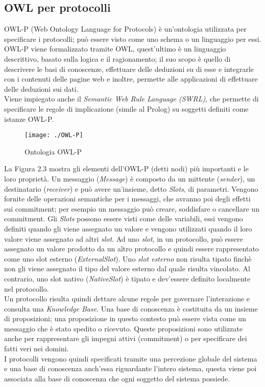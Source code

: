\documentclass[a4paper,12pt]{report}
\begin{document}
\subsection{OWL per protocolli}
OWL-P (Web Ontology Language for Protocols) è un'ontologia utilizzata per specificare i protocolli; può essere visto come uno schema o un linguaggio per essi.\\
OWL-P viene formalizzato tramite OWL, quest'ultimo è un linguaggio descrittivo, basato sulla logica e il ragionamento; il suo scopo è quello di descrivere le basi di conoscenze, effettuare delle deduzioni su di esse e integrarle con i contenuti delle pagine web e inoltre, permette alle applicazioni di effettuare delle deduzioni sui dati.\\
Viene impiegato anche il \textit{Semantic Web Rule Language (SWRL)}, che permette di specificare le regole di implicazione (simile al Prolog) su soggetti definiti come istanze OWL-P.
\begin{figure}[h]
    \begin{center}
        \texttt{[image: ./OWL-P]}
        \caption{Ontologia OWL-P}
        \label{OWL-P}
    \end{center}
\end{figure}
\newpage
La Figura 2.3 mostra gli elementi dell'OWL-P (detti nodi) più importanti e le loro proprietà. Un messaggio (\textit{Message}) è composto da un mittente (\textit{sender}), un destinatario (\textit{receiver}) e può avere un'insieme, detto \textit{Slots}, di parametri. Vengono fornite delle operazioni semantiche per i messaggi, che avranno poi degli effetti sui commitment; per esempio un messaggio può creare, soddisfare o cancellare un commitment. Gli \textit{Slots} possono essere visti come delle variabili, essi vengono definiti quando gli viene assegnato un valore e vengono utilizzati quando il loro valore viene assegnato ad altri \textit{slot}. Ad uno \textit{slot}, in un protocollo, può essere assegnato un valore prodotto da un altro protocollo e quindi essere rappresentato come uno slot esterno (\textit{ExternalSlot}). Uno \textit{slot esterno} non risulta tipato finchè non gli viene assegnato il tipo del valore esterno dal quale risulta vincolato. Al contrario, uno slot nativo (\textit{NativeSlot}) è tipato e dev'essere definito localmente nel protocollo.\\
Un protocollo risulta quindi dettare alcune regole per governare l'interazione e consulta una \textit{Knowledge Base}.
Una base di conoscenza è costituita da un insieme di proposizioni; una proposizione in questo contesto può essere vista come un messaggio che è stato spedito o ricevuto. Queste proposizioni sono utilizzate anche per rappresentare gli impegni attivi (commitment) o per specificare dei fatti veri nei domini.\\
I protocolli vengono quindi specificati tramite una percezione globale del sistema e una base di conoscenza anch'essa riguardante l'intero sistema, questa viene poi associata alla base di conoscenza che ogni soggetto del sistema possiede.
\end{document}
